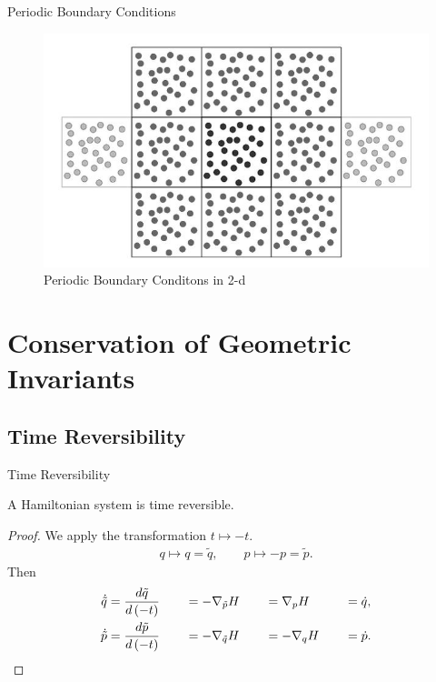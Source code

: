 \documentclass{beamer}
\begin{document}
\begin{frame}{Periodic Boundary Conditions}
\begin{figure}
	\centering
	\includegraphics[scale=0.6]{periodic_boundary_condition_2d.jpg}
  	\caption{Periodic Boundary Conditons in 2-d}
\end{figure}
\end{frame}

\section{Conservation of Geometric Invariants}

\subsection{Time Reversibility}

\begin{frame}{Time Reversibility}
\begin{theorem} A Hamiltonian system is time reversible. \end{theorem}
\begin{proof}
	We apply the transformation $t \mapsto -t$.
	\begin{align*}
		q \mapsto q = \tilde{q},  \quad \quad p \mapsto -p = \tilde{p}.
	\end{align*}
	Then
	\begin{alignat*}{4}
		\dot{\tilde{q}} &= \frac{d\tilde{q}}{d\left(-t\right)} \quad &&= -\nabla_{\tilde{p}}H \quad &&= \nabla_{p}H \quad &&= \dot{q},\\
		\dot{\tilde{p}} &= \frac{d\tilde{p}}{d\left(-t\right)} \quad &&= -\nabla_{\tilde{q}}H \quad && =-\nabla_{q}H \quad &&= \dot{p}. \qedhere
	\end{alignat*}
\end{proof}
\end{frame}
\end{document}
